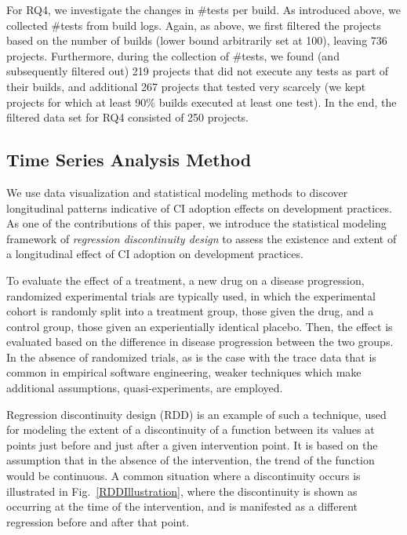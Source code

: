 For RQ4, we investigate the changes in \#tests per build.
As introduced above, we collected \#tests from build logs. 
Again, as above, we first filtered the projects based on the number of builds
(lower bound arbitrarily set at 100), leaving 736 projects. 
Furthermore, during the collection of \#tests, we found (and subsequently
filtered out) 219 projects that did not execute any tests as part of their \Tvis 
builds, and additional 267 projects that tested very scarcely (\ie we kept 
projects for which at least 90\% builds executed at least one test). 
In the end, the filtered data set for RQ4 consisted of 250 projects.

\subsection{Time Series Analysis Method}

We use data visualization and statistical modeling methods to discover 
longitudinal patterns indicative of CI adoption effects on development practices.
As one of the contributions of this paper, we introduce the statistical modeling 
framework of \emph{regression discontinuity design} to assess the existence 
and extent of a longitudinal effect of CI adoption on development practices.

To evaluate the effect of a treatment, \eg a new drug on a disease progression, 
randomized experimental trials are typically used, in which the experimental 
cohort is randomly split into a treatment group, \ie those given the drug, and 
a control group, \ie those given an experientially identical placebo. 
Then, the effect is evaluated based on the difference in disease progression 
between the two groups.
In the absence of randomized trials, as is the case with the trace data that is
common in empirical software engineering, weaker techniques which make 
additional assumptions, \eg quasi-experiments, are employed.

Regression discontinuity design (RDD) is an example of such a technique, 
used for modeling the extent of a discontinuity of a function between its values 
at points just before and just after a given intervention point. 
It is based on the assumption that in the absence of the intervention, the 
trend of the function would be continuous.
A common situation where a discontinuity occurs is illustrated in Fig.~\ref{RDDIllustration}, 
where the discontinuity is shown as occurring at the time of the intervention, 
and is manifested as a different regression before and after that point.

